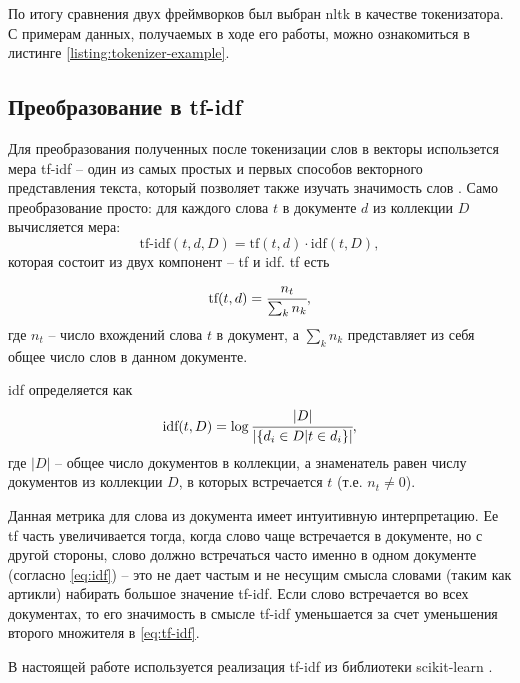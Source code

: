 По итогу сравнения двух фреймворков был выбран \gls{nltk} в качестве токенизатора.
С примерам данных, получаемых в ходе его работы, можно ознакомиться в листинге \ref{listing:tokenizer-example}.
\subsection{Преобразование в \acrshort{tf-idf}}
\label{par:tf-idf}
Для преобразования полученных после токенизации слов в векторы использется мера \acrfull{tf-idf} -- один из самых простых и первых способов векторного представления текста, который позволяет также изучать значимость слов \cite{cite:tf-idf-interpretation}.
Само преобразование просто: для каждого слова $t$ в документе $d$ из коллекции $D$ вычисляется мера:
\begin{equation}
    \label{eq:tf-idf}
    \text{tf-idf} (t, d, D) = \text{tf} (t, d) \cdot \text{idf} (t, D),
\end{equation}
которая состоит из двух компонент -- \acrfull{tf} и \acrfull{idf}.
\acrshort{tf} есть
\begin{equation}
    \label{eq:tf}
    \text{tf} (t, d) = \cfrac{n_t}{\sum_k n_k},
\end{equation}
где $n_t$ -- число вхождений слова $t$ в документ, а $\sum_k n_k$ представляет из себя общее число слов в данном документе.

\acrshort{idf} определяется как
\begin{equation}
    \label{eq:idf}
    \text{idf} (t, D) = \log \cfrac{|D|}{|\{d_i \in D | t \in d_i\}|},
\end{equation}
где $|D|$ -- общее число документов в коллекции, а знаменатель равен числу документов из коллекции $D$, в которых встречается $t$ (т.е. $n_t \neq 0$).

Данная метрика для слова из документа имеет интуитивную интерпретацию.
Ее \acrshort{tf} часть увеличивается тогда, когда слово чаще встречается в документе, но с другой стороны, слово должно встречаться часто именно в одном документе (согласно \eqref{eq:idf}) -- это не дает частым и не несущим смысла словами (таким как артикли) набирать большое значение \acrshort{tf-idf}.
Если слово встречается во всех документах, то его значимость в смысле \acrshort{tf-idf} уменьшается за счет уменьшения второго множителя в \eqref{eq:tf-idf}.

В настоящей работе используется реализация \acrshort{tf-idf} из библиотеки \gls{scikit-learn} \cite{cite:scikit-learn}.
